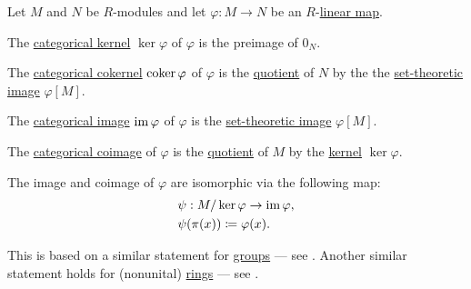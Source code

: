\begin{proposition}\label{thm:module_zero_morphisms}
  Let \( M \) and \( N \) be \( R \)-modules and let \( \varphi: M \to N \) be an \( R \)-\hyperref[def:module/homomorphism]{linear map}.

  \begin{thmenum}
     The \hyperref[def:zero_morphisms/kernel]{categorical kernel} \( \ker \varphi \) of \( \varphi \) is the preimage of \( 0_N \).

     The \hyperref[def:zero_morphisms/kernel]{categorical cokernel} \( \operatorname*{co\negthinspace\ker} \varphi \) of \( \varphi \) is the \hyperref[def:group/quotient]{quotient} of \( N \) by the the \hyperref[def:set_valued_map/image]{set-theoretic image} \( \varphi[M] \).

     The \hyperref[def:zero_morphisms/image]{categorical image} \( \operatorname{im} \varphi \) of \( \varphi \) is the \hyperref[def:set_valued_map/image]{set-theoretic image} \( \varphi[M] \).

     The \hyperref[def:zero_morphisms/coimage]{categorical coimage} of \( \varphi \) is the \hyperref[def:module/quotient]{quotient} of \( M \) by the \hyperref[def:module/kernel]{kernel} \( \ker \varphi \).

     The image and coimage of \( \varphi \) are isomorphic via the following map:
    \begin{equation}\label{eq:thm:module_zero_morphisms/isomorphism}
      \begin{aligned}
        &\psi: M / \ker \varphi \to \operatorname{im} \varphi, \\
        &\psi(\pi(x)) \coloneqq \varphi(x).
      \end{aligned}
    \end{equation}
  \end{thmenum}
\end{proposition}
\begin{comments}
  \item This is based on a similar statement for \hyperref[def:group]{groups} --- see . Another similar statement holds for (nonunital) \hyperref[def:ring]{rings} --- see .
\end{comments}
